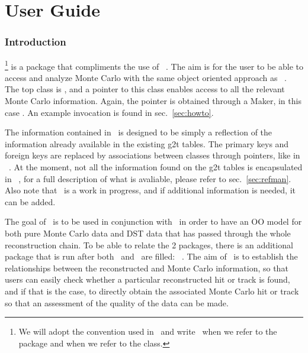 %
%
\tableofcontents
\cleardoublepage

%
%
\part{User Guide}
\clearpage


\section{Introduction}

\StMcEvent\footnote{We will adopt the convention used in \StEvent\ 
    and write \StMcEvent\ when we refer to the package and
     when we refer to the class.} is a package that
compliments the use of \StEvent\ . The aim is for the user to be able
to access and analyze Monte Carlo with the same object oriented
approach as \StEvent\ . The top class is , and a
pointer to this  class enables access to all the relevant Monte Carlo
information.  Again, the pointer is obtained through a Maker, in this
case \name{StMcEventMaker}.  An example invocation is found in sec.~\ref{sec:howto}.

The information contained in \StMcEvent\ is designed to be simply
a reflection of the information already available in the existing
g2t tables.  The primary keys and foreign keys are replaced by
associations between classes through pointers, like in \StEvent\ .
At the moment, not all the information found on the g2t tables is
encapsulated in \StMcEvent\ , for a full description of what is
avaliable, please refer to sec.~\ref{sec:refman}.  Also note that
\StMcEvent\ is a work in progress, and if additional information
is needed, it can be added.

The goal of \StMcEvent\ is to be used in conjunction with \StEvent\ in
order to have an OO model for both pure Monte Carlo data and DST data
that has passed through the whole reconstruction chain.  To be able
to relate the 2 packages, there is an additional package that is
run after both \StEvent\ and \StMcEvent\ are filled: \StAssociationMaker\ .
\index{StAssociationMaker}
The aim of \StAssociationMaker\ is to establish the relationships
between the reconstructed and Monte Carlo information, so that
users can easily check whether a particular reconstructed hit or
track is found, and if that is the case,
to directly obtain the associated Monte
Carlo hit or track so that an assessment of the quality of the
data can be made.

